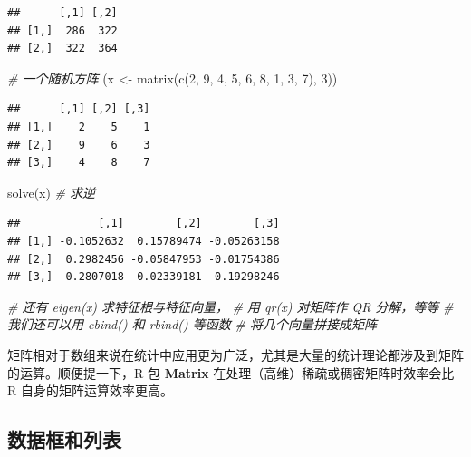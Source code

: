 \documentclass[
  b5paper,
  UTF8,twoside]{book}
\newenvironment{Shaded}{\begin{snugshade}}{\end{snugshade}}
\newcommand{\CommentTok}[1]{\textcolor[rgb]{0.56,0.35,0.01}{\textit{#1}}}
\newcommand{\DecValTok}[1]{\textcolor[rgb]{0.00,0.00,0.81}{#1}}
\newcommand{\FunctionTok}[1]{\textcolor[rgb]{0.00,0.00,0.00}{#1}}
\newcommand{\NormalTok}[1]{#1}
\newcommand{\OtherTok}[1]{\textcolor[rgb]{0.56,0.35,0.01}{#1}}
\begin{document}
\begin{verbatim}
##      [,1] [,2]
## [1,]  286  322
## [2,]  322  364
\end{verbatim}

\begin{Shaded}
\begin{Highlighting}[]
\CommentTok{\# 一个随机方阵}
\NormalTok{(x }\OtherTok{\textless{}{-}} \FunctionTok{matrix}\NormalTok{(}\FunctionTok{c}\NormalTok{(}\DecValTok{2}\NormalTok{, }\DecValTok{9}\NormalTok{, }\DecValTok{4}\NormalTok{, }\DecValTok{5}\NormalTok{, }\DecValTok{6}\NormalTok{, }\DecValTok{8}\NormalTok{, }\DecValTok{1}\NormalTok{, }\DecValTok{3}\NormalTok{, }\DecValTok{7}\NormalTok{), }\DecValTok{3}\NormalTok{))}
\end{Highlighting}
\end{Shaded}

\begin{verbatim}
##      [,1] [,2] [,3]
## [1,]    2    5    1
## [2,]    9    6    3
## [3,]    4    8    7
\end{verbatim}

\begin{Shaded}
\begin{Highlighting}[]
\FunctionTok{solve}\NormalTok{(x) }\CommentTok{\# 求逆}
\end{Highlighting}
\end{Shaded}

\begin{verbatim}
##            [,1]        [,2]        [,3]
## [1,] -0.1052632  0.15789474 -0.05263158
## [2,]  0.2982456 -0.05847953 -0.01754386
## [3,] -0.2807018 -0.02339181  0.19298246
\end{verbatim}

\begin{Shaded}
\begin{Highlighting}[]
\CommentTok{\# 还有 eigen(x) 求特征根与特征向量，}
\CommentTok{\#   用 qr(x) 对矩阵作 QR 分解，等等}
\CommentTok{\# 我们还可以用 cbind() 和 rbind() 等函数}
\CommentTok{\#   将几个向量拼接成矩阵}
\end{Highlighting}
\end{Shaded}

矩阵相对于数组来说在统计中应用更为广泛，尤其是大量的统计理论都涉及到矩阵的运算。顺便提一下，R 包 \textbf{Matrix} \citep{Matrix} 在处理（高维）稀疏或稠密矩阵时效率会比 R 自身的矩阵运算效率更高。

\hypertarget{ux6570ux636eux6846ux548cux5217ux8868}{%
\subsection{数据框和列表}\label{ux6570ux636eux6846ux548cux5217ux8868}}
\end{document}
